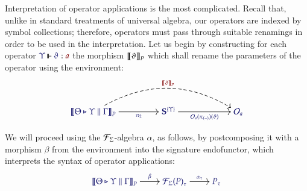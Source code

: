 \documentclass[11pt]{article}
\theoremstyle{definition}
\theoremstyle{remark}
\numberwithin{equation}{section}
\begin{document}
Interpretation of operator applications is the most complicated. Recall that,
unlike in standard treatments of universal algebra, our operators are indexed by
symbol collections; therefore, operators must pass through suitable renamings in
order to be used in the interpretation. Let us begin by constructing for each
operator $\IsOperator{\Upsilon}{\vartheta}{a}$ the morphism
$\left\llbracket\vartheta\right\rrbracket_P$ which shall rename the parameters of the operator
using the environment:
\[
  \begin{tikzcd}[cramped, ampersand replacement = \&, sep = huge]
    |[alias = Src]|
    {\IMode{
      {\SemBrackets{
        \Theta\triangleright\Upsilon\parallel\Gamma
      }}_{P}
    }}
      \arrow[
        , r
        , swap
        , "\IMode{\pi_2}"
      ]
\&
    {\IMode{\SymPsh^{\{\Upsilon\}}}}
      \arrow[
        , r
        , swap
        , "\IMode{\Operators_a(\pi_{(-)})(\vartheta)}"
      ]
\&[1.5em]
    |[alias = Tgt]|
    {\IMode{\Operators_a}}
      \arrow[
        , from = Src
        , to = Tgt
        , bend left
        , dashed
        , "\OMode{\SemBrackets{\vartheta}_{P}}"
      ]
  \end{tikzcd}
\]

We will proceed using the $\mathcal{F}_{\Sigma}$-algebra $\alpha$, as
follows, by postcomposing it with a morphism $\beta$ from the environment into
the signature endofunctor, which interprets the syntax of operator applications:
\[
  \begin{tikzcd}[cramped, ampersand replacement = \&]
    {\IMode{
      {\SemBrackets{\Theta\triangleright\Upsilon\parallel\Gamma}}_{P}
    }}
      \arrow[r, "\IMode{\beta}"]
\&
    {\IMode{
      {\SigFun{\Sigma}(P)}_{\tau}
    }}
      \arrow[r, "\IMode{\alpha_\tau}"]
\&
    {\IMode{P_\tau}}
  \end{tikzcd}
\]
\end{document}
